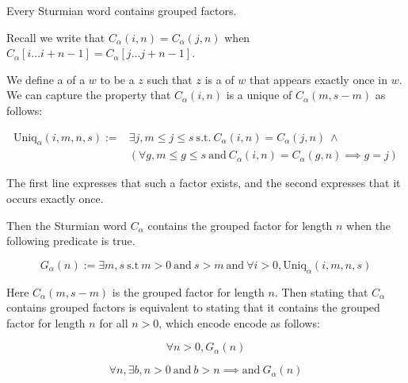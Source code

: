\begin{conjecture}\label{conj:grouped}
    Every Sturmian word contains grouped factors.
\end{conjecture}

Recall we write that $C_{\alpha}(i,n) = C_{\alpha}(j,n)$ when $C_{\alpha}[i \ldots i + n - 1] = C_{\alpha}[j \ldots j + n - 1]$.

We define a  of a \word $w$ to be a \word $z$ such that $z$ is a \factor of $w$ that appears exactly once in $w$.
We can capture the property that $C_{\alpha}(i,n)$ is a unique \factor of $C_{\alpha}(m, s - m)$ as follows:

\begin{equation*}
\begin{split}
\text{Uniq}_{\alpha}(i,m,n,s) :=& \exists j, m \leq j \leq s ~ \text{s.t.} ~ C_{\alpha}(i,n) = C_{\alpha}(j,n) ~ \wedge \\
                                & \left(\forall g, m \leq g \leq s ~ \text{and} ~ C_{\alpha}(i,n) = C_{\alpha}(g,n) \implies g = j \right)
\end{split}
\end{equation*}

The first line expresses that such a factor exists, and the second expresses that it occurs exactly once.

Then the Sturmian word $C_{\alpha}$ contains the grouped factor for length $n$ when the following predicate is true.

\begin{equation*}
    G_{\alpha}(n) := \exists m, s ~ \text{s.t} ~ m > 0 ~ \text{and} ~ s > m ~ \text{and} ~ \forall i > 0, \text{Uniq}_{\alpha}(i,m,n,s)
\end{equation*}

Here $C_{\alpha}(m,s - m)$ is the grouped factor for length $n$.
Then stating that $C_{\alpha}$ contains grouped factors is equivalent to stating that it contains the grouped factor for length $n$ for all $n > 0$, which encode encode as follows:

\begin{equation*}
    \forall n > 0, G_{\alpha}(n)
\end{equation*}

\begin{equation*}
    \forall n, \exists b, n > 0 ~ \text{and} ~ b > n \implies \text{and} ~ G_{\alpha}(n)
\end{equation*}

